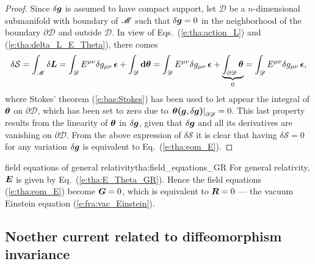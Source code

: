 \begin{proof}
Since $\delta\bm{g}$ is assumed to have compact support, let $\mathscr{D}$ be
a $n$-dimensional submanifold with boundary of $\mathscr{M}$ such that
$\delta\bm{g} = 0$ in the neighborhood of the boundary $\partial\mathscr{D}$ and outside $\mathscr{D}$.
In view of Eqs.~(\ref{e:tha:action_L}) and (\ref{e:tha:delta_L_E_Theta}), there comes
\[
    \delta \mathcal{S} = \int_{\mathscr{M}} \delta\bm{L} = \int_{\mathscr{D}} E^{\mu\nu} \delta g_{\mu\nu} \, \bm{\epsilon}
        + \int_{\mathscr{D}} \mathbf{d} \bm{\theta}
     = \int_{\mathscr{D}} E^{\mu\nu} \delta g_{\mu\nu} \, \bm{\epsilon}
        + \underbrace{\int_{\partial\mathscr{D}} \bm{\theta}}_{0}
     =  \int_{\mathscr{D}} E^{\mu\nu} \delta g_{\mu\nu} \, \bm{\epsilon} ,
\]
where Stokes' theorem (\ref{e:bas:Stokes}) has been used to let appear the integral
of $\bm{\theta}$ on $\partial\mathscr{D}$, which has been set to zero due
to $\left. \bm{\theta}\textbf{(}\bm{g},\delta\bm{g}\textbf{)} \right|_{\partial\mathscr{D}} = 0$.
This last property results from the linearity of $\bm{\theta}$ in $\delta\bm{g}$, given that
$\delta\bm{g}$ and all its derivatives are vanishing on $\partial\mathscr{D}$.
From the above expression of $\delta\mathcal{S}$ it is clear that having $\delta \mathcal{S} = 0$ for any variation $\delta\bm{g}$ is equivalent to
Eq.~(\ref{e:tha:eom_E}).
\end{proof}

\begin{texample}{field equations of general relativity}{tha:field_equations_GR}{}
For general relativity, $\bm{E}$ is given by Eq.~(\ref{e:tha:E_Theta_GR}).
Hence the field equations (\ref{e:tha:eom_E}) become $\bm{G} = 0$, which
is equivalent to $\bm{R}=0$ --- the
vacuum Einstein equation
(\ref{e:fra:vac_Einstein}).
\end{texample}

\subsection{Noether current related to diffeomorphism invariance}


